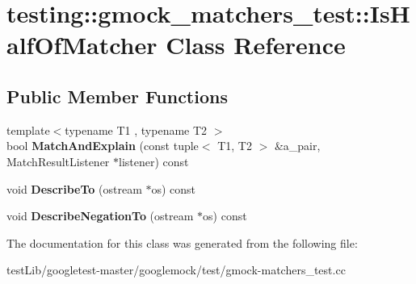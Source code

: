 \hypertarget{classtesting_1_1gmock__matchers__test_1_1IsHalfOfMatcher}{}\section{testing\+:\+:gmock\+\_\+matchers\+\_\+test\+:\+:Is\+Half\+Of\+Matcher Class Reference}
\label{classtesting_1_1gmock__matchers__test_1_1IsHalfOfMatcher}
\subsection*{Public Member Functions}
\begin{DoxyCompactItemize}
\item 
\mbox{\label{classtesting_1_1gmock__matchers__test_1_1IsHalfOfMatcher_a8c919d71f6f7e05ac76c67f37107808c}} 
{\footnotesize template$<$typename T1 , typename T2 $>$ }\\bool {\bfseries Match\+And\+Explain} (const tuple$<$ T1, T2 $>$ \&a\+\_\+pair, Match\+Result\+Listener $\ast$listener) const
\item 
\mbox{\label{classtesting_1_1gmock__matchers__test_1_1IsHalfOfMatcher_aaf62b9984288cc339599286352d82e91}} 
void {\bfseries Describe\+To} (ostream $\ast$os) const
\item 
\mbox{\label{classtesting_1_1gmock__matchers__test_1_1IsHalfOfMatcher_a759ba45c89acfa77a4e1afe95e7b768d}} 
void {\bfseries Describe\+Negation\+To} (ostream $\ast$os) const
\end{DoxyCompactItemize}


The documentation for this class was generated from the following file\+:\begin{DoxyCompactItemize}
\item 
test\+Lib/googletest-\/master/googlemock/test/gmock-\/matchers\+\_\+test.\+cc\end{DoxyCompactItemize}
